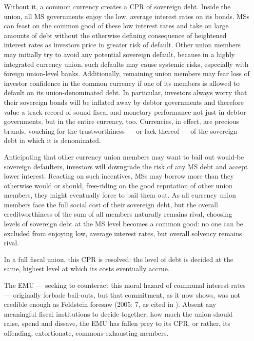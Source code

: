 \documentclass[11pt,a4paper,oneside]{article}
\begin{document}
Without it, a common currency creates a \gls{CPR} of sovereign debt.
Inside the union, all \gls{MS} governments enjoy the low, average interest rates on its bonds.
\glspl{MS} can feast on the common good of these low interest rates and take on large amounts of debt without the otherwise defining consequence of heightened interest rates as investors price in greater risk of default. %
Other union members may initially try to avoid any potential sovereign default, because in a highly integrated currency union, such defaults may cause systemic risks, especially with foreign union-level banks.
Additionally, remaining union members may fear loss of investor confidence in the common currency if one of its members is allowed to default on its union-denominated debt.
In particular, investors always worry that their sovereign bonds will be inflated away by debtor governments and therefore value a track record of sound fiscal and monetary performance not just in debtor governments, but in the entire currency, too.
Currencies, in effect, are precious brands, vouching for the trustworthiness --- or lack thereof --- of the sovereign debt in which it is denominated.

Anticipating that other currency union members may want to bail out would-be sovereign defaulters, investors will downgrade the risk of any \gls{MS} debt and accept lower interest.
Reacting on such incentives, \glspl{MS} may borrow more than they otherwise would or should, free-riding on the good reputation of other union members, they might eventually force to bail them out.
As all currency union members face the full social cost of their sovereign debt, but the overall creditworthiness of the sum of all members naturally remains rival, choosing levels of sovereign debt at the \gls{MS} level becomes a common good:
no one can be excluded from enjoying low, average interest rates, but overall solvency remains rival.

In a full fiscal union, this \gls{CPR} is resolved:
the level of debt is decided at the same, highest level at which its costs eventually accrue.

The \gls{EMU} --- seeking to counteract this moral hazard of communal interest rates --- originally forbade bail-outs, but that commitment, as it now shows, was not credible enough as Feldstein foresaw (2005: 7, as cited in \citealt[13]{Begg2008}).
Absent any meaningful fiscal institutions to decide together, how much the union should raise, spend and dissave, the \gls{EMU} has fallen prey to its \gls{CPR}, or rather, its offending, extortionate, commons-exhausting members.
\end{document}
